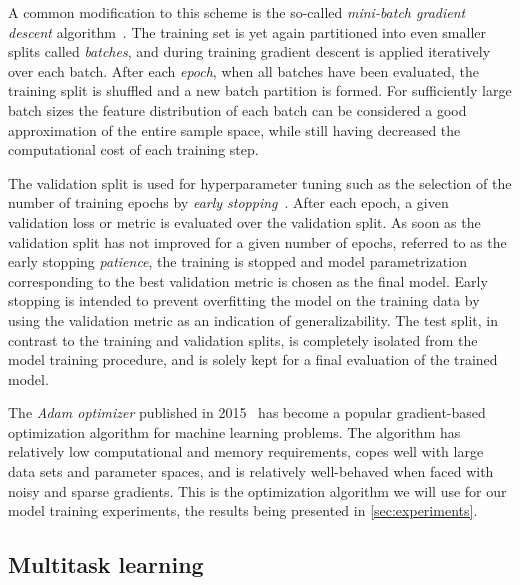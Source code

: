 A common modification to this scheme is the so-called \textit{mini-batch gradient descent} algorithm~\cite{gradient-descent}.
The training set is yet again partitioned into even smaller splits called \textit{batches}, and during training gradient descent is applied iteratively over each batch.
After each \textit{epoch}, when all batches have been evaluated, the training split is shuffled and a new batch partition is formed.
For sufficiently large batch sizes the feature distribution of each batch can be considered a good approximation of the entire sample space, while still having decreased the computational cost of each training step.

The validation split is used for hyperparameter tuning such as the selection of the number of training epochs by \textit{early stopping}~\cite{early-stopping}.
After each epoch, a given validation loss or metric is evaluated over the validation split.
As soon as the validation split has not improved for a given number of epochs, referred to as the early stopping \textit{patience}, the training is stopped and model parametrization corresponding to the best validation metric is chosen as the final model.
Early stopping is intended to prevent overfitting the model on the training data by using the validation metric as an indication of generalizability.
The test split, in contrast to the training and validation splits, is completely isolated from the model training procedure, and is solely kept for a final evaluation of the trained model.

The \textit{Adam optimizer} published in 2015~\cite{adam-optimizer} has become a popular gradient-based optimization algorithm for machine learning problems.
The algorithm has relatively low computational and memory requirements, copes well with large data sets and parameter spaces, and is relatively well-behaved when faced with noisy and sparse gradients.
This is the optimization algorithm we will use for our model training experiments, the results being presented in \cref{sec:experiments}.

\subsection{Multitask learning}
